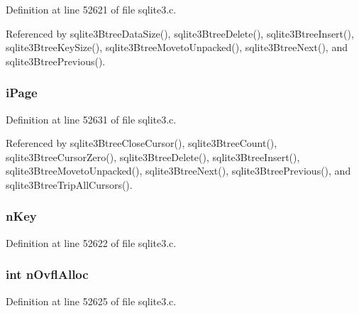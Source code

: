 Definition at line 52621 of file sqlite3.\+c.



Referenced by sqlite3\+Btree\+Data\+Size(), sqlite3\+Btree\+Delete(), sqlite3\+Btree\+Insert(), sqlite3\+Btree\+Key\+Size(), sqlite3\+Btree\+Moveto\+Unpacked(), sqlite3\+Btree\+Next(), and sqlite3\+Btree\+Previous().

\hypertarget{struct_bt_cursor_a37e2c5de2a48868560612bced0c093aa}{}
\subsubsection[{i\+Page}]{ i\+Page}\label{struct_bt_cursor_a37e2c5de2a48868560612bced0c093aa}


Definition at line 52631 of file sqlite3.\+c.



Referenced by sqlite3\+Btree\+Close\+Cursor(), sqlite3\+Btree\+Count(), sqlite3\+Btree\+Cursor\+Zero(), sqlite3\+Btree\+Delete(), sqlite3\+Btree\+Insert(), sqlite3\+Btree\+Moveto\+Unpacked(), sqlite3\+Btree\+Next(), sqlite3\+Btree\+Previous(), and sqlite3\+Btree\+Trip\+All\+Cursors().

\hypertarget{struct_bt_cursor_a528c39e09f68386edd6e2fbb64784561}{}
\subsubsection[{n\+Key}]{ n\+Key}\label{struct_bt_cursor_a528c39e09f68386edd6e2fbb64784561}


Definition at line 52622 of file sqlite3.\+c.

\hypertarget{struct_bt_cursor_acf0ab682d2f00d7bfea7e4e35dba7fc9}{}
\subsubsection[{n\+Ovfl\+Alloc}]{\setlength{\rightskip}{0pt plus 5cm}int n\+Ovfl\+Alloc}\label{struct_bt_cursor_acf0ab682d2f00d7bfea7e4e35dba7fc9}


Definition at line 52625 of file sqlite3.\+c.

\hypertarget{struct_bt_cursor_a2bc66d19c064bb25ff335241f8c621df}{}
